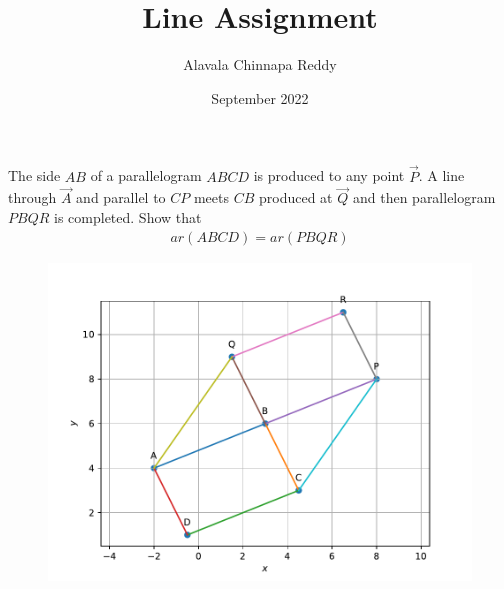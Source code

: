 \documentclass[journal,10pt,twocolumn]{article}
\title{\textbf{Line Assignment}}
\author{Alavala Chinnapa Reddy}
\date{September 2022}
\begin{document}
\maketitle
\fi
 The side $AB$ of a parallelogram $ABCD$ is produced to any point $\vec{P}$. A line through $\vec{A}$ and parallel to $CP$ meets $CB$ produced at $\vec{Q}$ and then parallelogram $PBQR$ is completed. Show that
 \begin{align}
	 ar(ABCD) = ar(PBQR)
		\label{eq:9/9/3/9}
 \end{align}
	\begin{figure}[!h]
		\centering
 \includegraphics[width=\columnwidth]{chapters/9/9/3/9/figs/l1.pdf}
		\caption{}
		\label{fig:9/9/3/9}
  	\end{figure}
\end{document}
